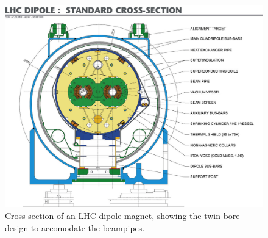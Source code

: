\begin{figure}
\centering
  \includegraphics[width=0.5\linewidth]{plots/LHC/LHC_dipole.jpeg} %
  \caption{Cross-section of an LHC dipole magnet, showing the twin-bore design to accomodate the beampipes. \protect\cite{Team:40524}}
  \label{fig:lhc_dipole}
\end{figure}